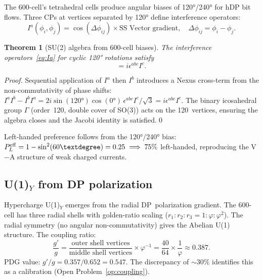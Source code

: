 \documentclass[11pt,a4paper]{article}
\newtheorem{theorem}{Theorem}[section]
\newcommand{\phig}{\varphi}
\begin{document}
The 600-cell's tetrahedral cells produce angular biases of
120°/240° for hDP bit flows.  Three CPs at vertices separated by
120° define interference operators:
\begin{equation}
I^a(\phi_i,\phi_j)
= \cos(\Delta\phi_{ij})\times\text{SS~Vector gradient},
\quad \Delta\phi_{ij} = \phi_i - \phi_j.
\label{eq:Ia}
\end{equation}

\begin{theorem}[SU(2) algebra from 600-cell biases]
\label{thm:su2}
The interference operators~\eqref{eq:Ia} for cyclic 120° rotations
satisfy
\begin{equation}
[I^a, I^b] = i\epsilon^{abc}I^c.
\label{eq:su2}
\end{equation}
\end{theorem}

\begin{proof}
Sequential application of $I^a$ then $I^b$ introduces a Nexus
cross-term from the non-commutativity of phase shifts:
$I^aI^b - I^bI^a
= 2i\sin(120°)\cos(0°)\,\epsilon^{abc}I^c/\sqrt{3}
= i\epsilon^{abc}I^c$.
The binary icosahedral group $\Gamma$ (order~120, double cover of
SO(3)) acts on the 120~vertices, ensuring the algebra closes
and the Jacobi identity is satisfied.\qed
\end{proof}

Left-handed preference follows from the 120°/240° bias:
$P_L^{\rm eff} = 1 - \sin^2(60°) = 0.25 \implies 75\%$ left-handed,
reproducing the V$-$A structure of weak charged currents.

\subsection{U(1)$_Y$ from DP polarization}

Hypercharge U(1)$_Y$ emerges from the radial DP~polarization gradient.
The 600-cell has three radial shells with golden-ratio scaling
($r_1 : r_2 : r_3 = 1 : \phig : \phig^2$).  The radial symmetry (no
angular non-commutativity) gives the Abelian U(1) structure.
The coupling ratio:
\begin{equation}
\frac{g'}{g}
= \frac{\text{outer shell vertices}}{\text{middle shell vertices}}
  \times\phig^{-1}
= \frac{40}{64}\times\frac{1}{\phig}
\approx 0.387.
\label{eq:coupling_ratio}
\end{equation}
PDG value: $g'/g = 0.357/0.652 = 0.547$.  The discrepancy of
$\sim30\%$ identifies this as a calibration (Open
Problem~\ref{op:coupling}).
\end{document}
